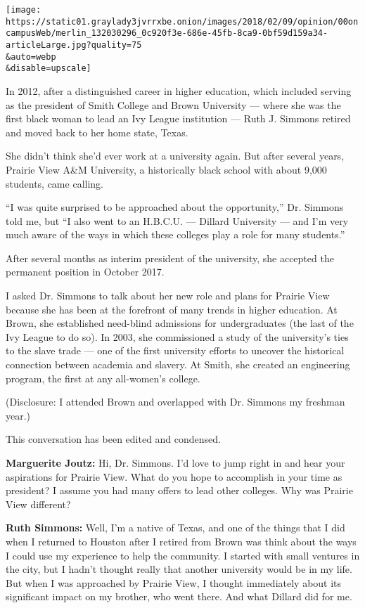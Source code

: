 \texttt{[image: https://static01.graylady3jvrrxbe.onion/images/2018/02/09/opinion/00oncampusWeb/merlin\_132030296\_0c920f3e-686e-45fb-8ca9-0bf59d159a34-articleLarge.jpg?quality=75\\\&auto=webp\\\&disable=upscale]}

In 2012, after a distinguished career in higher education, which
included serving as the president of Smith College and Brown University
--- where she was the first black woman to lead an Ivy League
institution --- Ruth J. Simmons retired and moved back to her home
state, Texas.

She didn't think she'd ever work at a university again. But after
several years, Prairie View A\&M University, a historically black school
with about 9,000 students, came calling.

``I was quite surprised to be approached about the opportunity,'' Dr.
Simmons told me, but ``I also went to an H.B.C.U. --- Dillard University
--- and I'm very much aware of the ways in which these colleges play a
role for many students.''

After several months as interim president of the university, she
accepted the permanent position in October 2017.

I asked Dr. Simmons to talk about her new role and plans for Prairie
View because she has been at the forefront of many trends in higher
education. At Brown, she established need-blind admissions for
undergraduates (the last of the Ivy League to do so). In 2003, she
commissioned a study of the university's ties to the slave trade --- one
of the first university efforts to uncover the historical connection
between academia and slavery. At Smith, she created an engineering
program, the first at any all-women's college.

(Disclosure: I attended Brown and overlapped with Dr. Simmons my
freshman year.)

This conversation has been edited and condensed.

\textbf{Marguerite Joutz:} Hi, Dr. Simmons. I'd love to jump right in
and hear your aspirations for Prairie View. What do you hope to
accomplish in your time as president? I assume you had many offers to
lead other colleges. Why was Prairie View different?

\textbf{Ruth Simmons:} Well, I'm a native of Texas, and one of the
things that I did when I returned to Houston after I retired from Brown
was think about the ways I could use my experience to help the
community. I started with small ventures in the city, but I hadn't
thought really that another university would be in my life. But when I
was approached by Prairie View, I thought immediately about its
significant impact on my brother, who went there. And what Dillard did
for me.

